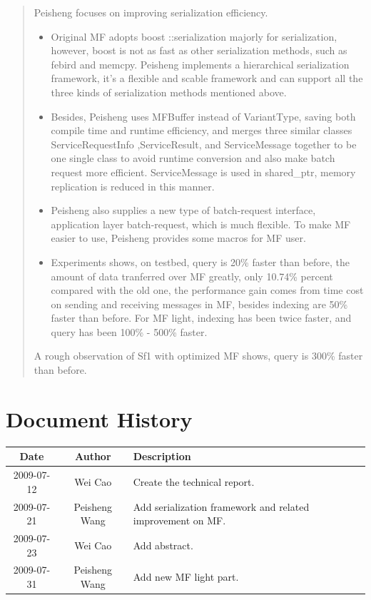 \documentclass[a4paper,10pt]{article}
\begin{document}
\begin{abstract}
Peisheng focuses on improving serialization efficiency.
\begin{itemize}
\item Original MF adopts boost ::serialization majorly for serialization, however, boost is not as fast as other serialization methods, such as febird and memcpy.
Peisheng implements a hierarchical serialization framework, it's a flexible and scable framework and can support all the three kinds of serialization methods mentioned above.
\item Besides, Peisheng uses MFBuffer instead of VariantType, saving both compile time and runtime efficiency,
and merges three similar classes ServiceRequestInfo ,ServiceResult, and ServiceMessage together to be one single class to avoid 
runtime conversion and also make batch request more efficient. ServiceMessage is used in shared\_ptr, memory replication is reduced in this manner.
\item Peisheng also supplies a new type of batch-request interface, application layer batch-request, which is much flexible. To make MF easier to use, Peisheng provides some macros for MF user.
\item Experiments shows, on testbed, query is 20\% faster than before, the amount of data tranferred over MF greatly, only 10.74\% percent compared with the old one, 
the performance gain comes from time cost on sending and receiving messages in MF, besides indexing are 50\% faster than before. For MF light, indexing has been twice faster, and query has been 100\% - 500\% faster. 
\end{itemize}

A rough observation of Sf1 with optimized MF shows, query is 300\% faster than before.
\end{abstract}

\tableofcontents

\section{Document History}
\begin{center}
\begin{tabular}{|c|c|p{7cm}|}
    \hline
    Date & Author & Description \\ \hline
    2009-07-12& Wei Cao & Create the technical report. \\ \hline
    2009-07-21& Peisheng Wang & Add serialization framework and related improvement on MF. \\ \hline
    2009-07-23& Wei Cao & Add abstract. \\ \hline
    2009-07-31& Peisheng Wang & Add new MF light part. \\ \hline
\end{tabular}
\end{center}
\end{document}
